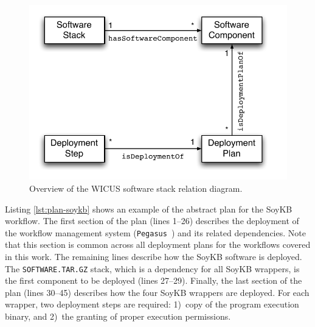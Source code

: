 \begin{figure}[!htb]
	\centering
	\includegraphics[width=0.9\linewidth]{figures/stack-rel}
	\caption{Overview of the WICUS software stack relation diagram.}
	\label{fig:stack-rel}
\end{figure}

Listing \ref{lst:plan-soykb} shows an example of the abstract plan for the SoyKB workflow. 
The first section of the plan (lines 1--26) describes the deployment of the workflow 
management system (\texttt{Pegasus}~\cite{Deelman-FGCS-2014}) and its related 
dependencies. Note that this section is common across all deployment plans for the workflows 
covered in this work. The remaining lines describe how the SoyKB software is deployed. 
The \texttt{SOFTWARE.TAR.GZ} stack, which is a dependency for all SoyKB wrappers, is 
the first component to be deployed (lines 27--29). Finally, the last section of the plan (lines 
30--45) describes how the four SoyKB wrappers are deployed. For each wrapper, two 
deployment steps are required: 1)~copy of the program execution binary, and 2)~the
 granting of proper execution permissions.

